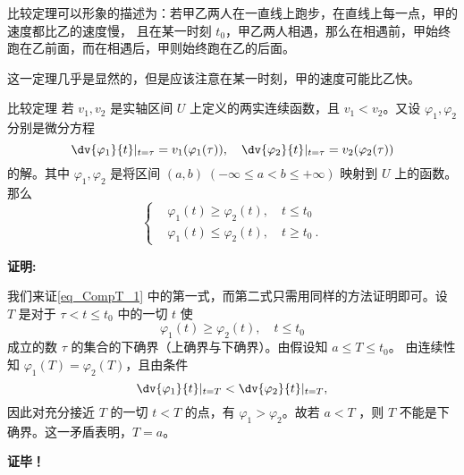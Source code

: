 比较定理可以形象的描述为：若甲乙两人在一直线上跑步，在直线上每一点，甲的速度都比乙的速度慢， 且在某一时刻 $t_0$，甲乙两人相遇，那么在相遇前，甲始终跑在乙前面，而在相遇后，甲则始终跑在乙的后面。

这一定理几乎是显然的，但是应该注意在某一时刻，甲的速度可能比乙快。
\begin{theorem}{比较定理}
若 $v_1,v_2$ 是实轴区间 $U$ 上定义的两实连续函数，且 $v_1<v_2$。又设 $\varphi_1,\varphi_2$ 分别是微分方程
\begin{equation}
\dv{\varphi_1}{t}|_{t=\tau}=v_1(\varphi_1(\tau)), \quad \dv{\varphi_2}{t}|_{t=\tau}=v_2(\varphi_2(\tau))
\end{equation}
的解。其中 $\varphi_1,\varphi_2$ 是将区间 $(a,b)\;(-\infty\leq a<b\leq+\infty)$ 映射到 $U$ 上的函数。那么
\begin{equation}\label{eq_CompT_1}
\left\{\begin{aligned}
    &\varphi_1(t)\geq\varphi_2(t),\quad t\leq t_0\\
    &\varphi_1(t)\leq\varphi_2(t),\quad t\geq t_0~.
\end{aligned}\right.
\end{equation}

\end{theorem} 
\textbf{证明:}

我们来证\autoref{eq_CompT_1} 中的第一式，而第二式只需用同样的方法证明即可。设 $T$ 是对于 $\tau<t\leq t_0$ 中的一切 $t$ 使
\begin{equation}
\varphi_1(t)\geq\varphi_2(t),\quad t\leq t_0
\end{equation}
成立的数 $\tau$ 的集合的下确界（上确界与下确界）。由假设知 $a\leq T\leq t_0$。
由连续性知 $\varphi_1(T)=\varphi_2(T)$，且由条件
\begin{equation}
\dv{\varphi_1}{t}|_{t=T}<\dv{\varphi_2}{t}|_{t=T},
\end{equation}
因此对充分接近 $T$ 的一切 $t<T$ 的点，有 $\varphi_1>\varphi_2$。故若 $a<T$ ，则 $T$ 不能是下确界。这一矛盾表明，$T=a$。

\textbf{证毕！}
